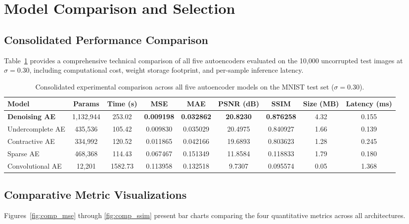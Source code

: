 \documentclass[12pt, a4paper]{article}
\begin{document}
\section{Model Comparison and Selection}

\subsection{Consolidated Performance Comparison}
Table~\ref{tab:model_comparison} provides a comprehensive technical comparison of all five autoencoders evaluated on the 10,000 uncorrupted test images at $\sigma = 0.30$, including computational cost, weight storage footprint, and per-sample inference latency.

\begin{table}[htbp]
\centering
\caption{Consolidated experimental comparison across all five autoencoder models on the MNIST test set ($\sigma = 0.30$).}
\label{tab:model_comparison}
\small
\begin{tabularx}{\textwidth}{lcccccccc}
\toprule
\textbf{Model} & \textbf{Params} & \textbf{Time (s)} & \textbf{MSE} & \textbf{MAE} & \textbf{PSNR (dB)} & \textbf{SSIM} & \textbf{Size (MB)} & \textbf{Latency (ms)} \\
\midrule
\textbf{Denoising AE} & 1,132,944 & 253.02 & \textbf{0.009198} & \textbf{0.032862} & \textbf{20.8230} & \textbf{0.876258} & 4.32 & 0.155 \\
Undercomplete AE      & 435,536   & 105.42 & 0.009830          & 0.035029          & 20.4975          & 0.840927          & 1.66 & 0.139 \\
Contractive AE        & 334,992   & 120.52 & 0.011865          & 0.042166          & 19.6893          & 0.803623          & 1.28 & 0.245 \\
Sparse AE             & 468,368   & 114.43 & 0.067467          & 0.151349          & 11.8584          & 0.118833          & 1.79 & 0.180 \\
Convolutional AE      & 12,201    & 1582.73& 0.113958          & 0.132518          & 9.7307           & 0.095574          & 0.05 & 1.368 \\
\bottomrule
\end{tabularx}
\end{table}

\subsection{Comparative Metric Visualizations}
Figures~\ref{fig:comp_mse} through \ref{fig:comp_ssim} present bar charts comparing the four quantitative metrics across all architectures.
\end{document}
